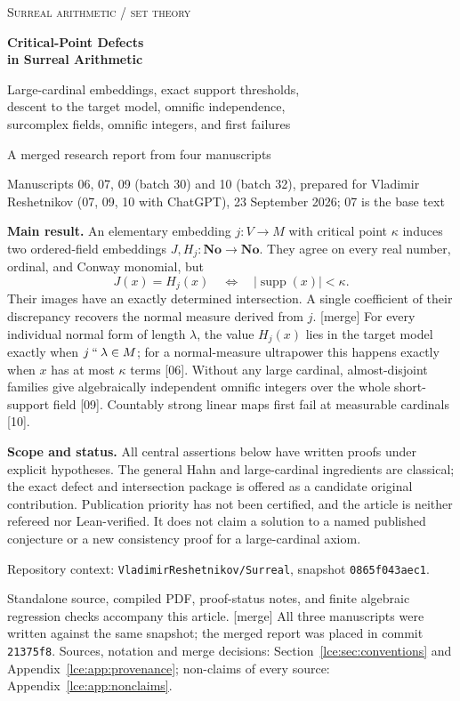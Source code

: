 \documentclass[11pt,letterpaper]{article}
\numberwithin{equation}{section}
\theoremstyle{definition}
\theoremstyle{remark}
\newcommand{\No}{\mathbf{No}}
\newcommand{\supp}{\operatorname{supp}}
\newcommand{\imset}[2]{#1\mathbin{``}#2}
\newcommand{\abs}[1]{\lvert#1\rvert}
\newcommand{\repo}{\texttt{0865f043aec1}}
\newcommand{\status}[1]{\begin{tcolorbox}[colback=pale,colframe=ink,boxrule=.45pt,arc=0pt,left=9pt,right=9pt,top=7pt,bottom=7pt]#1\end{tcolorbox}}
\newcommand{\src}[1]{\textup{\textsf{\small[#1]}}}%
\newcommand{\mergetag}{\textup{\textsf{\small[merge]}}}%
\begin{document}
\hypersetup{pageanchor=false}
\begin{titlepage}
\thispagestyle{empty}
\vspace*{0.45in}
{\color{ink}\large\scshape Surreal arithmetic / set theory}\par
\vspace{0.3in}
{\huge\bfseries Critical-Point Defects\\[7pt] in Surreal Arithmetic\par}
\vspace{0.25in}
{\Large Large-cardinal embeddings, exact support thresholds,\\[5pt]
 descent to the target model, omnific independence,\\[5pt]
 surcomplex fields, omnific integers, and first failures\par}
\vspace{0.35in}
{\large A merged research report from four manuscripts}\par
\vspace{0.13in}
Manuscripts 06, 07, 09 (batch 30) and 10 (batch 32), prepared for Vladimir
Reshetnikov (07, 09, 10 with ChatGPT), 23 September 2026; 07 is the base text\par
\vspace{0.3in}
\status{\textbf{Main result.} An elementary embedding $j:V\to M$ with critical
point $\kappa$ induces two ordered-field embeddings $J,H_j:\No\to\No$.
They agree on every real number, ordinal, and Conway monomial, but
\[
 J(x)=H_j(x)\quad\Longleftrightarrow\quad
 \abs{\supp(x)}<\kappa.
\]
Their images have an exactly determined intersection. A single coefficient
of their discrepancy recovers the normal measure derived from $j$.
\mergetag{} For every individual normal form of length $\lambda$, the value
$H_j(x)$ lies in the target model exactly when $\imset j\lambda\in M$; for a
normal-measure ultrapower this happens exactly when $x$ has at most $\kappa$
terms \src{06}. Without any large cardinal, almost-disjoint families give
algebraically independent omnific integers over the whole short-support
field \src{09}. Countably strong linear maps first fail at measurable
cardinals \src{10}.}
\vfill
\textbf{Scope and status.} All central assertions below have written proofs
under explicit hypotheses. The general Hahn and large-cardinal ingredients
are classical; the exact defect and intersection package is offered as a
candidate original contribution. Publication priority has not been certified,
and the article is neither refereed nor Lean-verified. It does not claim a
solution to a named published conjecture or a new consistency proof for a
large-cardinal axiom.
\vspace{0.24in}

\small Repository context: \texttt{VladimirReshetnikov/Surreal}, snapshot
\repo.\par
Standalone source, compiled PDF, proof-status notes, and finite algebraic
regression checks accompany this article.
\mergetag{} All three manuscripts were written against the same snapshot;
the merged report was placed in commit \texttt{21375f8}. Sources, notation
and merge decisions: Section~\ref{lce:sec:conventions} and
Appendix~\ref{lce:app:provenance}; non-claims of every source:
Appendix~\ref{lce:app:nonclaims}.
\end{titlepage}
\end{document}
